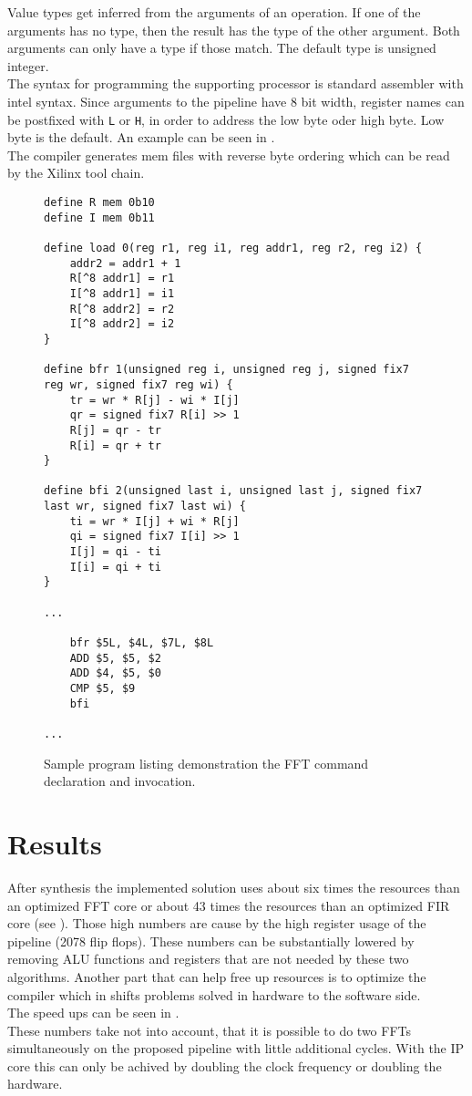 \documentclass[11pt,twocolumn,technote,a4paper]{IEEEtran}
\begin{document}
Value types get inferred from the arguments of an operation. If one of the
arguments has no type, then the result has the type of the other argument. Both
arguments can only have a type if those match. The default type is unsigned
integer.\\
The syntax for programming the supporting processor is standard assembler
with intel syntax. Since arguments to the pipeline have 8 bit width,
register names can be postfixed with \verb+L+ or \verb+H+, in order to
address the low byte oder high byte. Low byte is the default. An example
can be seen in .\\
The compiler generates mem files with reverse byte ordering which can be read
by the Xilinx tool chain.
\begin{figure*}[tb]
    \centering
    \begin{lstlisting}[basicstyle=\tiny,morekeywords={define,mem,reg,unsigned,signed,fix7,ADD,CMD,last}]
define R mem 0b10
define I mem 0b11

define load 0(reg r1, reg i1, reg addr1, reg r2, reg i2) {
    addr2 = addr1 + 1
    R[^8 addr1] = r1
    I[^8 addr1] = i1
    R[^8 addr2] = r2
    I[^8 addr2] = i2
}

define bfr 1(unsigned reg i, unsigned reg j, signed fix7 reg wr, signed fix7 reg wi) {
    tr = wr * R[j] - wi * I[j]
    qr = signed fix7 R[i] >> 1
    R[j] = qr - tr
    R[i] = qr + tr
}

define bfi 2(unsigned last i, unsigned last j, signed fix7 last wr, signed fix7 last wi) {
    ti = wr * I[j] + wi * R[j]
    qi = signed fix7 I[i] >> 1
    I[j] = qi - ti
    I[i] = qi + ti
}

...

    bfr $5L, $4L, $7L, $8L
    ADD $5, $5, $2
    ADD $4, $5, $0
    CMP $5, $9
    bfi

...
    \end{lstlisting}
    \caption{Sample program listing demonstration the FFT command declaration and invocation.}
    \label{lst:fft}
\end{figure*}


\section{Results}
\label{sec:results}
After synthesis the implemented solution uses about six times the resources
than an optimized FFT core \cite{xilinx_fft} or about 43 times the resources
than an optimized FIR core \cite{xilinx_fir} (see ). Those
high numbers are cause by the high register usage of the pipeline (2078 flip
flops). These numbers can be substantially lowered by removing ALU functions
and registers that are not needed by these two algorithms. Another part that
can help free up resources is to optimize the compiler which in shifts
problems solved in hardware to the software side.\\
The speed ups can be seen in .\\
These numbers take not into account, that it is possible to do two FFTs
simultaneously on the proposed pipeline with little additional cycles. With
the IP core this can only be achived by doubling the clock frequency or
doubling the hardware.
\end{document}
